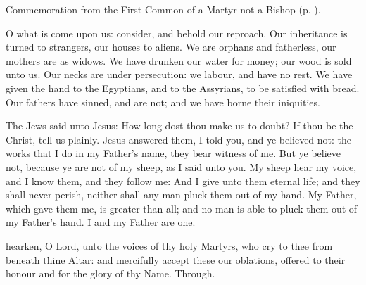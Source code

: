 \begin{rubric}
	Commemoration  from the First Common of a Martyr not a Bishop (p. \pageref{CommonMartyrNotBishopICollect}).
\end{rubric}

 O  what is come upon us: consider, and behold our reproach. Our inheritance is turned to strangers, our houses to aliens. We are orphans and fatherless, our mothers are as widows. We have drunken our water for money; our wood is sold unto us. Our necks are under persecution: we labour, and have no rest. We have given the hand to the Egyptians, and to the Assyrians, to be satisfied with bread. Our fathers have sinned, and are not; and we have borne their iniquities.


\tractnotice
{}

\clearpage
{}
 The Jews said unto Jesus: How long dost thou make us to doubt? If thou be the Christ, tell us plainly. Jesus answered them, I told you, and ye believed not: the works that I do in my Father's name, they bear witness of me. But ye believe not, because ye are not of my sheep, as I said unto you. My sheep hear my voice, and I know them, and they follow me: And I give unto them eternal life; and they shall never perish, neither shall any man pluck them out of my hand. My Father, which gave them me, is greater than all; and no man is able to pluck them out of my Father's hand. I and my Father are one.


\secret
{} hearken, O Lord, unto the voices of thy holy Martyrs, who cry to thee from beneath thine Altar: and mercifully accept these our oblations, offered to their honour and for the glory of thy Name. Through.


